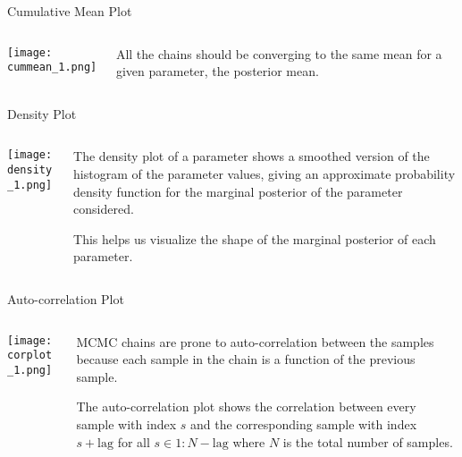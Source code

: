 \begin{frame}{Cumulative Mean Plot}
    \begin{columns}
        \begin{column}{0.5\textwidth}
            \centering
            \texttt{[image: cummean\_1.png]}
        \end{column}
        \begin{column}{0.5\textwidth}
            All the chains should be converging to the same mean for a given parameter, the posterior mean.
        \end{column}
    \end{columns}
\end{frame}

\begin{frame}{Density Plot}
    \begin{columns}
        \begin{column}{0.5\textwidth}
            \centering
            \texttt{[image: density\_1.png]}
        \end{column}
        \begin{column}{0.5\textwidth}
            \begin{vfilleditems}
                \item The density plot of a parameter shows a smoothed version of the histogram of the parameter values, giving an approximate probability density function for the marginal posterior of the parameter considered.
                \item This helps us visualize the shape of the marginal posterior of each parameter.
            \end{vfilleditems}
        \end{column}
    \end{columns}
\end{frame}

\begin{frame}{Auto-correlation Plot}
    \begin{columns}
        \begin{column}{0.5\textwidth}
            \centering
            \texttt{[image: corplot\_1.png]}
        \end{column}
        \begin{column}{0.5\textwidth}
            \begin{vfilleditems}
                \item MCMC chains are prone to auto-correlation between the samples because each sample in the chain is a function of the previous sample.
                \item The auto-correlation plot shows the correlation between every sample with index $s$ and the corresponding sample with index $s + \text{lag}$ for all $s \in 1:N-\text{lag}$ where $N$ is the total number of samples.
            \end{vfilleditems}
        \end{column}
    \end{columns}
\end{frame}

